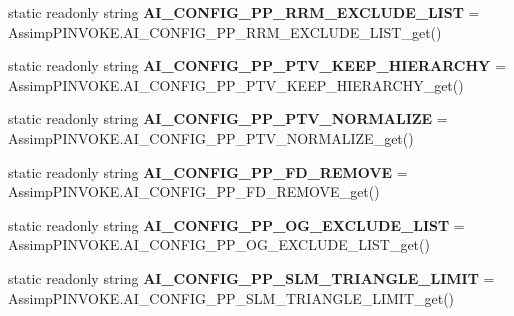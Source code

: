 \begin{DoxyCompactItemize}
\item 
\hypertarget{class_assimp_abd67496b9cfe90a0497ae4de5235cdd4}{static readonly string {\bfseries A\+I\+\_\+\+C\+O\+N\+F\+I\+G\+\_\+\+P\+P\+\_\+\+R\+R\+M\+\_\+\+E\+X\+C\+L\+U\+D\+E\+\_\+\+L\+I\+S\+T} = Assimp\+P\+I\+N\+V\+O\+K\+E.\+A\+I\+\_\+\+C\+O\+N\+F\+I\+G\+\_\+\+P\+P\+\_\+\+R\+R\+M\+\_\+\+E\+X\+C\+L\+U\+D\+E\+\_\+\+L\+I\+S\+T\+\_\+get()}\label{class_assimp_abd67496b9cfe90a0497ae4de5235cdd4}

\item 
\hypertarget{class_assimp_adeb590bb51eccda2b4647545b2e239c9}{static readonly string {\bfseries A\+I\+\_\+\+C\+O\+N\+F\+I\+G\+\_\+\+P\+P\+\_\+\+P\+T\+V\+\_\+\+K\+E\+E\+P\+\_\+\+H\+I\+E\+R\+A\+R\+C\+H\+Y} = Assimp\+P\+I\+N\+V\+O\+K\+E.\+A\+I\+\_\+\+C\+O\+N\+F\+I\+G\+\_\+\+P\+P\+\_\+\+P\+T\+V\+\_\+\+K\+E\+E\+P\+\_\+\+H\+I\+E\+R\+A\+R\+C\+H\+Y\+\_\+get()}\label{class_assimp_adeb590bb51eccda2b4647545b2e239c9}

\item 
\hypertarget{class_assimp_ac5529dba7838e989a7845a5c1f36299e}{static readonly string {\bfseries A\+I\+\_\+\+C\+O\+N\+F\+I\+G\+\_\+\+P\+P\+\_\+\+P\+T\+V\+\_\+\+N\+O\+R\+M\+A\+L\+I\+Z\+E} = Assimp\+P\+I\+N\+V\+O\+K\+E.\+A\+I\+\_\+\+C\+O\+N\+F\+I\+G\+\_\+\+P\+P\+\_\+\+P\+T\+V\+\_\+\+N\+O\+R\+M\+A\+L\+I\+Z\+E\+\_\+get()}\label{class_assimp_ac5529dba7838e989a7845a5c1f36299e}

\item 
\hypertarget{class_assimp_a0891241420de7927d4a5fa3b10a69b49}{static readonly string {\bfseries A\+I\+\_\+\+C\+O\+N\+F\+I\+G\+\_\+\+P\+P\+\_\+\+F\+D\+\_\+\+R\+E\+M\+O\+V\+E} = Assimp\+P\+I\+N\+V\+O\+K\+E.\+A\+I\+\_\+\+C\+O\+N\+F\+I\+G\+\_\+\+P\+P\+\_\+\+F\+D\+\_\+\+R\+E\+M\+O\+V\+E\+\_\+get()}\label{class_assimp_a0891241420de7927d4a5fa3b10a69b49}

\item 
\hypertarget{class_assimp_a643b13d8c30c1e614e092982379e8b09}{static readonly string {\bfseries A\+I\+\_\+\+C\+O\+N\+F\+I\+G\+\_\+\+P\+P\+\_\+\+O\+G\+\_\+\+E\+X\+C\+L\+U\+D\+E\+\_\+\+L\+I\+S\+T} = Assimp\+P\+I\+N\+V\+O\+K\+E.\+A\+I\+\_\+\+C\+O\+N\+F\+I\+G\+\_\+\+P\+P\+\_\+\+O\+G\+\_\+\+E\+X\+C\+L\+U\+D\+E\+\_\+\+L\+I\+S\+T\+\_\+get()}\label{class_assimp_a643b13d8c30c1e614e092982379e8b09}

\item 
\hypertarget{class_assimp_a17f2f079f029995a1a671d7774d2b3ab}{static readonly string {\bfseries A\+I\+\_\+\+C\+O\+N\+F\+I\+G\+\_\+\+P\+P\+\_\+\+S\+L\+M\+\_\+\+T\+R\+I\+A\+N\+G\+L\+E\+\_\+\+L\+I\+M\+I\+T} = Assimp\+P\+I\+N\+V\+O\+K\+E.\+A\+I\+\_\+\+C\+O\+N\+F\+I\+G\+\_\+\+P\+P\+\_\+\+S\+L\+M\+\_\+\+T\+R\+I\+A\+N\+G\+L\+E\+\_\+\+L\+I\+M\+I\+T\+\_\+get()}\label{class_assimp_a17f2f079f029995a1a671d7774d2b3ab}


\end{DoxyCompactItemize}
